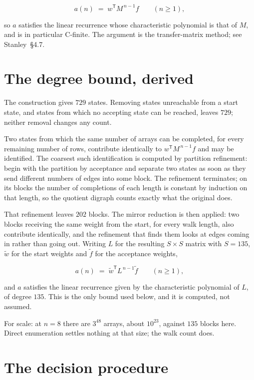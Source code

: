 \documentclass[11pt]{article}
\theoremstyle{definition}
\begin{document}
\[a(n) \;=\; w^{\mathsf T} M^{\,n-1} f \qquad (n \ge 1),\]

so $a$ satisfies the linear recurrence whose characteristic polynomial is that of $M$, and is in particular C-finite. The argument is the transfer-matrix method; see Stanley~\S4.7.

\section{The degree bound, derived}

The construction gives $729$ states. Removing states unreachable from a start state, and states from which no accepting state can be reached, leaves $729$; neither removal changes any count.

Two states from which the same number of arrays can be completed, for every remaining number of rows, contribute identically to $w^{\mathsf T}M^{\,n-1}f$ and may be identified. The coarsest such identification is computed by partition refinement: begin with the partition by acceptance and separate two states as soon as they send different numbers of edges into some block. The refinement terminates; on its blocks the number of completions of each length is constant by induction on that length, so the quotient digraph counts exactly what the original does.

That refinement leaves $202$ blocks. The mirror reduction is then applied: two blocks receiving the same weight from the start, for every walk length, also contribute identically, and the refinement that finds them looks at edges coming in rather than going out. Writing $L$ for the resulting $S \times S$ matrix with $S = 135$, $\tilde w$ for the start weights and $\tilde f$ for the acceptance weights,

\[a(n) \;=\; \tilde w^{\mathsf T} L^{\,n-1} \tilde f \qquad (n \ge 1),\]

and $a$ satisfies the linear recurrence given by the characteristic polynomial of $L$, of degree $135$. This is the only bound used below, and it is computed, not assumed.

For scale: at $n = 8$ there are $3^{48}$ arrays, about $10^{23}$, against $135$ blocks here. Direct enumeration settles nothing at that size; the walk count does.

\section{The decision procedure}
\end{document}
